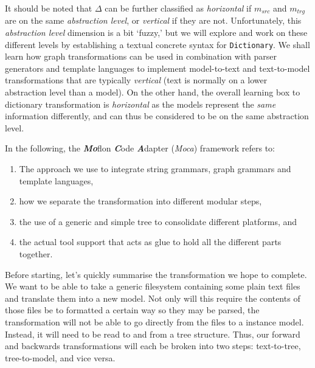 It should be noted that $\Delta$ can be further classified as \emph{horizontal} if $m_{src}$ and $m_{trg}$ are on the same
\emph{abstraction level}, or \emph{vertical} if they are not. Unfortunately, this \emph{abstraction level} dimension is a bit `fuzzy,' but we will explore and
work on these different levels by establishing a textual concrete syntax for \texttt{Dictionary}. We shall learn how graph transformations can be used in
combination with parser generators and template languages to implement model-to-text and text-to-model transformations that are typically \emph{vertical} (text
is normally on a lower abstraction level than a model). On the other hand, the overall learning box to dictionary transformation is \emph{horizontal} as the
models represent the \emph{same} information differently, and can thus be considered to be on the same abstraction level.

In the following, the \emph{\bf Mo}flon \emph{\bf C}ode \emph{\bf A}dapter (\emph{Moca}) framework refers to:
\begin{enumerate}

 \item The approach we use to integrate string grammars, graph grammars and template languages, 

 \item how we separate the transformation into different modular steps, 

 \item the use of a generic and simple tree to consolidate different platforms, and 

 \item the actual tool support that acts as glue to hold all the different parts together.

\end{enumerate}



Before starting, let's quickly summarise the transformation we hope to complete. We want to be able to take a generic filesystem containing some plain text
files and translate them into a new model. Not only will this require the contents of those files be to formatted a certain way so they may be parsed, the
transformation will not be able to go directly from the files to a instance model. Instead, it will need to be read to and from a tree structure. Thus, our forward and backwards transformations will each
be broken into two steps: text-to-tree, tree-to-model, and vice versa.
